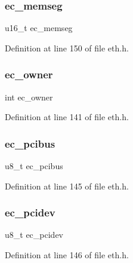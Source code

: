 \subsubsection{\texorpdfstring{ec\+\_\+memseg}{ec\_memseg}}
{\footnotesize\ttfamily u16\+\_\+t ec\+\_\+memseg}



Definition at line 150 of file eth.\+h.

\hypertarget{structeth__card_a2c5b20aea6d29454bd362a2defe6d88e}{}\label{structeth__card_a2c5b20aea6d29454bd362a2defe6d88e} 
\subsubsection{\texorpdfstring{ec\+\_\+owner}{ec\_owner}}
{\footnotesize\ttfamily int ec\+\_\+owner}



Definition at line 141 of file eth.\+h.

\hypertarget{structeth__card_ad90ce637514b7f6a3542d3d86c66f508}{}\label{structeth__card_ad90ce637514b7f6a3542d3d86c66f508} 
\subsubsection{\texorpdfstring{ec\+\_\+pcibus}{ec\_pcibus}}
{\footnotesize\ttfamily u8\+\_\+t ec\+\_\+pcibus}



Definition at line 145 of file eth.\+h.

\hypertarget{structeth__card_abf4406307f3957e03a1f0d696b4c4a0f}{}\label{structeth__card_abf4406307f3957e03a1f0d696b4c4a0f} 
\subsubsection{\texorpdfstring{ec\+\_\+pcidev}{ec\_pcidev}}
{\footnotesize\ttfamily u8\+\_\+t ec\+\_\+pcidev}



Definition at line 146 of file eth.\+h.

\hypertarget{structeth__card_a6421c01a6ff80f52f9f1a6034fd145fe}{}\label{structeth__card_a6421c01a6ff80f52f9f1a6034fd145fe} 
